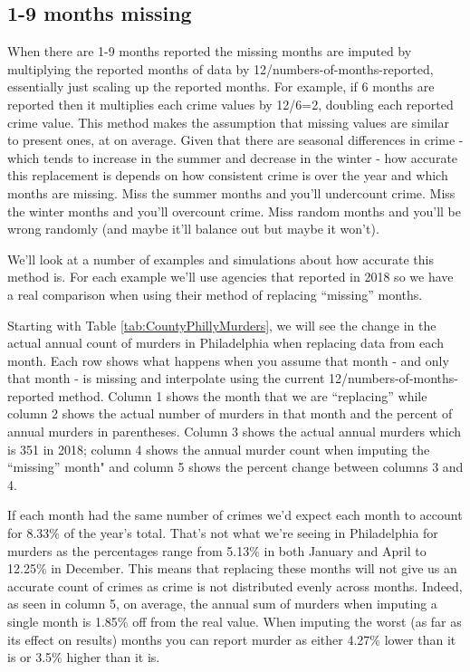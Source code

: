 \documentclass[
  12pt,
  openany]{book}
\begin{document}
\hypertarget{months-missing}{%
\subsection{1-9 months missing}\label{months-missing}}

When there are 1-9 months reported the missing months are imputed by multiplying the reported months of data by 12/numbers-of-months-reported, essentially just scaling up the reported months. For example, if 6 months are reported then it multiplies each crime values by 12/6=2, doubling each reported crime value. This method makes the assumption that missing values are similar to present ones, at on average. Given that there are seasonal differences in crime - which tends to increase in the summer and decrease in the winter - how accurate this replacement is depends on how consistent crime is over the year and which months are missing. Miss the summer months and you'll undercount crime. Miss the winter months and you'll overcount crime. Miss random months and you'll be wrong randomly (and maybe it'll balance out but maybe it won't).

We'll look at a number of examples and simulations about how accurate this method is. For each example we'll use agencies that reported in 2018 so we have a real comparison when using their method of replacing ``missing'' months.

Starting with Table \ref{tab:CountyPhillyMurders}, we will see the change in the actual annual count of murders in Philadelphia when replacing data from each month. Each row shows what happens when you assume that month - and only that month - is missing and interpolate using the current 12/numbers-of-months-reported method. Column 1 shows the month that we are ``replacing'' while column 2 shows the actual number of murders in that month and the percent of annual murders in parentheses. Column 3 shows the actual annual murders which is 351 in 2018; column 4 shows the annual murder count when imputing the ``missing'' month" and column 5 shows the percent change between columns 3 and 4.

If each month had the same number of crimes we'd expect each month to account for 8.33\% of the year's total. That's not what we're seeing in Philadelphia for murders as the percentages range from 5.13\% in both January and April to 12.25\% in December. This means that replacing these months will not give us an accurate count of crimes as crime is not distributed evenly across months. Indeed, as seen in column 5, on average, the annual sum of murders when imputing a single month is 1.85\% off from the real value. When imputing the worst (as far as its effect on results) months you can report murder as either 4.27\% lower than it is or 3.5\% higher than it is.
\end{document}
